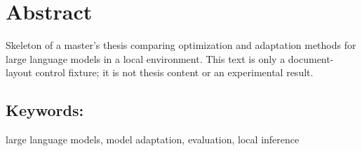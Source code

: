 \chapter*{Abstract}

Skeleton of a master's thesis comparing optimization and adaptation methods for large language models in a local environment. This text is only a document-layout control fixture; it is not thesis content or an experimental result.

\section*{Keywords:}
\noindent large language models, model adaptation, evaluation, local inference
